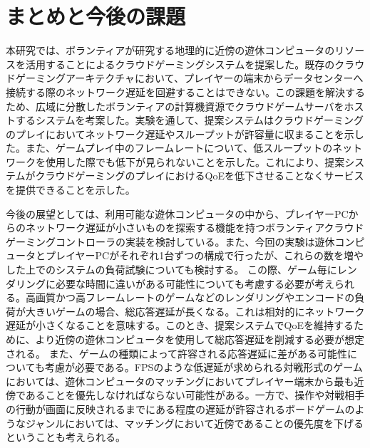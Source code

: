 \section{まとめと今後の課題}
本研究では、ボランティアが研究する地理的に近傍の遊休コンピュータのリソースを活用することによるクラウドゲーミングシステムを提案した。既存のクラウドゲーミングアーキテクチャにおいて、プレイヤーの端末からデータセンターへ接続する際のネットワーク遅延を回避することはできない。この課題を解決するため、広域に分散したボランティアの計算機資源でクラウドゲームサーバをホストするシステムを考案した。実験を通して、提案システムはクラウドゲーミングのプレイにおいてネットワーク遅延やスループットが許容量に収まることを示した。また、ゲームプレイ中のフレームレートについて、低スループットのネットワークを使用した際でも低下が見られないことを示した。これにより、提案システムがクラウドゲーミングのプレイにおけるQoEを低下させることなくサービスを提供できることを示した。

今後の展望としては、利用可能な遊休コンピュータの中から、プレイヤーPCからのネットワーク遅延が小さいものを探索する機能を持つボランティアクラウドゲーミングコントローラの実装を検討している。また、今回の実験は遊休コンピュータとプレイヤーPCがそれぞれ1台ずつの構成で行ったが、これらの数を増やした上でのシステムの負荷試験についても検討する。%
この際、ゲーム毎にレンダリングに必要な時間に違いがある可能性についても考慮する必要が考えられる。高画質かつ高フレームレートのゲームなどのレンダリングやエンコードの負荷が大きいゲームの場合、総応答遅延が長くなる。これは相対的にネットワーク遅延が小さくなることを意味する。このとき、提案システムでQoEを維持するために、より近傍の遊休コンピュータを使用して総応答遅延を削減する必要が想定される。
また、ゲームの種類によって許容される応答遅延に差がある可能性についても考慮が必要である。FPSのような低遅延が求められる対戦形式のゲームにおいては、遊休コンピュータのマッチングにおいてプレイヤー端末から最も近傍であることを優先しなければならない可能性がある。一方で、操作や対戦相手の行動が画面に反映されるまでにある程度の遅延が許容されるボードゲームのようなジャンルにおいては、マッチングにおいて近傍であることの優先度を下げるということも考えられる。

